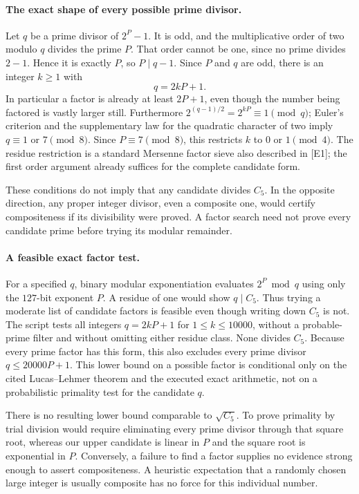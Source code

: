 \documentclass[11pt,a4paper]{article}
\begin{document}
\paragraph{The exact shape of every possible prime divisor.}
Let $q$ be a prime divisor of $2^P-1$. It is odd, and the multiplicative
order of two modulo $q$ divides the prime $P$. That order cannot be one,
since no prime divides $2-1$. Hence it is exactly $P$, so $P\mid q-1$.
Since $P$ and $q$ are odd, there is an integer $k\ge1$ with
\[
                         q=2kP+1.
\]
In particular a factor is already at least $2P+1$, even though the
number being factored is vastly larger still. Furthermore
$2^{(q-1)/2}=2^{kP}\equiv1\pmod q$; Euler's criterion and the
supplementary law for the quadratic character of two imply
$q\equiv1$ or $7\pmod8$. Since $P\equiv7\pmod8$, this restricts
$k$ to $0$ or $1\pmod4$. The residue restriction is a standard Mersenne
factor sieve also described in [E1]; the first order argument already
suffices for the complete candidate form.

These conditions do not imply that any candidate divides $C_5$.
In the opposite direction, any proper integer divisor, even a composite
one, would certify compositeness if its divisibility were proved. A
factor search need not prove every candidate prime before trying its
modular remainder.

\paragraph{A feasible exact factor test.}
For a specified $q$, binary modular exponentiation evaluates
$2^P\bmod q$ using only the $127$-bit exponent $P$. A residue of one
would show $q\mid C_5$. Thus trying a moderate list of candidate
factors is feasible even though writing down $C_5$ is not.
The script tests all integers $q=2kP+1$ for $1\le k\le10000$, without
a probable-prime filter and without omitting either residue class.
None divides $C_5$. Because every prime factor has this form, this
also excludes every prime divisor $q\le20000P+1$.
This lower bound on a possible factor is conditional only on the cited
Lucas--Lehmer theorem and the executed exact arithmetic, not on a
probabilistic primality test for the candidate $q$.

There is no resulting lower bound comparable to $\sqrt{C_5}$.
To prove primality by trial division would require eliminating every
prime divisor through that square root, whereas our upper candidate
is linear in $P$ and the square root is exponential in $P$. Conversely,
a failure to find a factor supplies no evidence strong enough to assert
compositeness. A heuristic expectation that a randomly chosen large
integer is usually composite has no force for this individual number.
\end{document}
